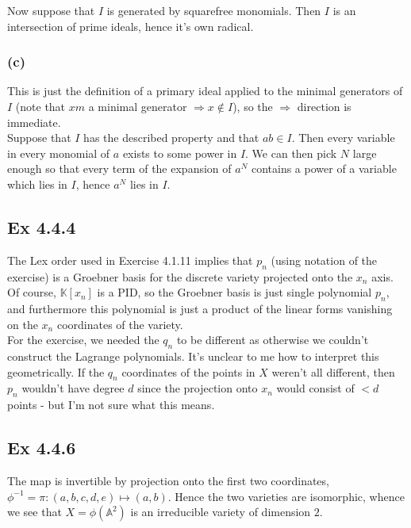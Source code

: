 \documentclass{article}
\theoremstyle{definition}
\newcommand{\K}{\mathbb{K}}
\newcommand{\A}{\mathbb{A}}
\renewcommand{\AA}[1]{\A^{#1}}
\begin{document}
Now suppose that $I$ is generated by squarefree monomials. Then $I$ is an
intersection of prime ideals, hence it's own radical.

\subsubsection*{(c)}

This is just the definition of a primary ideal applied to the minimal
generators of $I$ (note that $xm$ a minimal generator $\Rightarrow x \not \in
I$), so the $\Rightarrow$ direction is immediate. \\

Suppose that $I$ has the described property and that $ab \in I$. Then every
variable in every monomial of $a$ exists to some power in $I$. We can then pick
$N$ large enough so that every term of the expansion of $a^N$ contains a power
of a variable which lies in $I$, hence $a^N$ lies in $I$. \\

\subsection*{Ex 4.4.4}

The Lex order used in Exercise 4.1.11 implies that $p_n$ (using notation of the
exercise) is a Groebner basis for the discrete variety projected onto the $x_n$
axis. Of course, $\K[x_n]$ is a PID, so the Groebner basis is just single
polynomial $p_n$, and furthermore this polynomial is just a product of the
linear forms vanishing on the $x_n$ coordinates of the variety. \\

For the exercise, we needed the $q_n$ to be different as otherwise we couldn't
construct the Lagrange polynomials. It's unclear to me how to interpret this
geometrically. If the $q_n$ coordinates of the points in $X$ weren't all
different, then $p_n$ wouldn't have degree $d$ since the projection onto $x_n$
would consist of $< d$ points - but I'm not sure what this means. 

\subsection*{Ex 4.4.6}

The map is invertible by projection onto the first two coordinates, $\phi^{-1}
= \pi : (a,b,c,d,e) \mapsto (a, b)$. Hence the two varieties are isomorphic,
whence we see that $X = \phi(\AA{2})$ is an irreducible variety of dimension
$2$. \\
\end{document}
